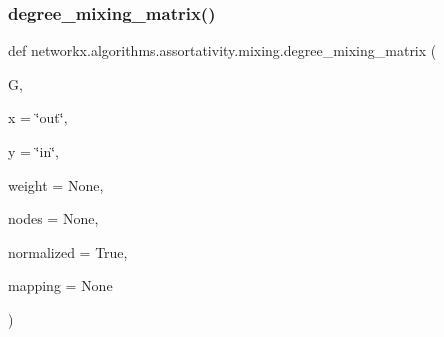\subsubsection{\texorpdfstring{degree\+\_\+mixing\+\_\+matrix()}{degree\_mixing\_matrix()}}
{\footnotesize\ttfamily def networkx.\+algorithms.\+assortativity.\+mixing.\+degree\+\_\+mixing\+\_\+matrix (\begin{DoxyParamCaption}\item[{}]{G,  }\item[{}]{x = {\ttfamily \char`\"{}out\char`\"{}},  }\item[{}]{y = {\ttfamily \char`\"{}in\char`\"{}},  }\item[{}]{weight = {\ttfamily None},  }\item[{}]{nodes = {\ttfamily None},  }\item[{}]{normalized = {\ttfamily True},  }\item[{}]{mapping = {\ttfamily None} }\end{DoxyParamCaption})}

